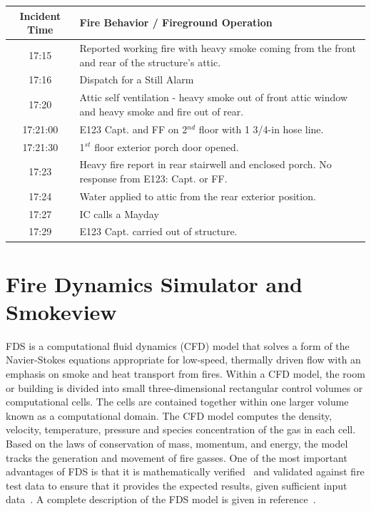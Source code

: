 \documentclass[11pt,oneside]{book}
\begin{document}
\bigskip 
\begin{minipage}{.8\linewidth}
\centering
{}\label{tab:fire_info}
\begin{tabular}{c m{0.25in}}
\toprule[1.5pt]
Incident Time & Fire Behavior / Fireground Operation  \\
\midrule
17:15    & Reported working fire with heavy smoke coming from the front and rear of the structure's attic. \\
17:16    & Dispatch for a Still Alarm \\
17:20    & Attic self ventilation - heavy smoke out of front attic window and heavy smoke and fire out of rear. \\  
17:21:00 & E123 Capt. and FF on 2$^{nd}$ floor with 1 3/4-in hose line. \\
17:21:30 & 1$^{st}$ floor exterior porch door opened. \\
17:23    & Heavy fire report in rear stairwell and enclosed porch. No response from E123: Capt. or FF. \\
17:24    & Water applied to attic from the rear exterior position. \\
17:27    & IC calls a Mayday \\
17:29    & E123 Capt. carried out of structure. \\
\bottomrule[1.25pt]
\end{tabular}\par
\bigskip
\end{minipage}
 

\chapter{Fire Dynamics Simulator and Smokeview}
FDS is a computational fluid dynamics (CFD) model that solves a form of the Navier-Stokes equations appropriate for low-speed, thermally driven flow with an emphasis on smoke and heat transport from fires.  Within a CFD model, the room or building is divided into small three-dimensional rectangular control volumes or computational cells.  The cells are contained together within one larger volume known as a computational domain.  The CFD model computes the density, velocity, temperature, pressure and species concentration of the gas in each cell.  Based on the laws of conservation of mass, momentum,  and energy, the model tracks the generation and movement of fire gasses. One of the most important advantages of FDS is that it is  mathematically verified~\cite{FDS_Verification_Guide} and validated against fire test data to ensure that it provides the expected results, given sufficient input data~\cite{FDS_Validation_Guide}.  A complete description of the FDS model is given in reference~\cite{FDS_Math_Guide}.
\end{document}
